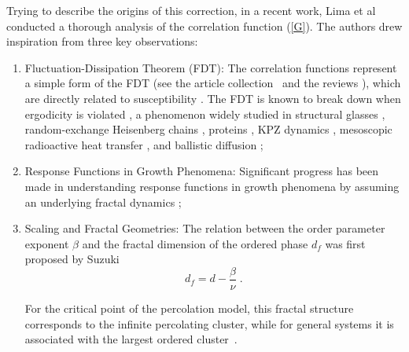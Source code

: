 \documentclass[pre,aps,twocolumn,showpacs,floatfix,nofootinbib,superscriptaddress,linenumbers]{revtex4-1}
\begin{document}
Trying to describe the origins of this correction, in a recent work, Lima et al~\cite{Lima24} conducted a thorough analysis of the correlation function (\ref{G}). The authors drew inspiration from three key observations: 
\begin{enumerate}
\item Fluctuation-Dissipation Theorem (FDT): The correlation functions represent a simple form of the FDT (see the article collection~\cite{Nowak22} and the  reviews \cite{Oliveira19,GomesFilho25}), which are directly related to susceptibility \cite{Goldenfeld18}. The FDT is known to break down when ergodicity is violated \cite{Costa03,Wen23}, a phenomenon widely studied in structural glasses \cite{Grigera99,Ricci-Tersenghi00,Crisanti03,Barrat98,Bellon02,Bellon06}, random-exchange Heisenberg chains \cite{Vainstein05}, proteins \cite{Hayashi07}, KPZ dynamics \cite{Kardar86,Rodriguez19}, mesoscopic radioactive heat transfer \cite{Perez-Madrid09,Averin10}, and ballistic diffusion \cite{Costa03,Costa06,Lapas07,Lapas08};
\item Response Functions in Growth Phenomena: Significant progress has been made in understanding response functions in growth phenomena by assuming an underlying fractal dynamics \cite{Barabasi95,Feder22, GomesFilho21b,Anjos21,Luis22,Luis23,GomesFilho24};
\item  Scaling and Fractal Geometries:  The relation between the order parameter exponent $\beta$ and
the fractal dimension of the ordered phase $d_f$ was first proposed by Suzuki \cite{Suzuki8}
\begin{equation}
\label{dl}
d_f=d-\frac{\beta}{\nu}\;.
\end{equation}

For the critical point of the percolation model, this fractal structure corresponds to the infinite percolating cluster\cite{Grimmett06,Cruz23}, while for general systems it is associated with the largest ordered cluster~\cite{Kroger00}. 
\end{enumerate}
\end{document}
